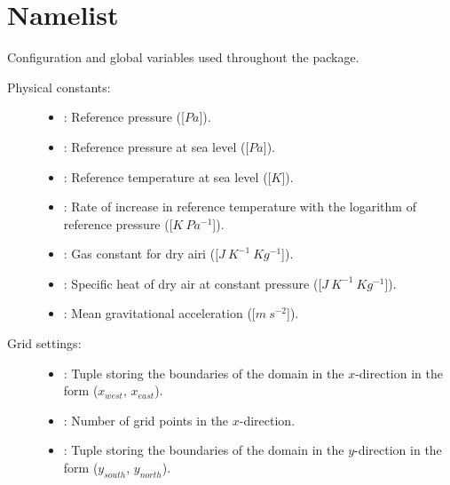 \documentclass[letterpaper,10pt,english]{sphinxmanual}
\begin{document}
\section{Namelist}
\label{\detokenize{api:namelist}}\label{\detokenize{api:module-namelist}}
Configuration and global variables used throughout the package.
\begin{description}
\item[{Physical constants:}] \leavevmode\begin{itemize}
\item {} 
: Reference pressure ({[}\(Pa\){]}).

\item {} 
: Reference pressure at sea level ({[}\(Pa\){]}).

\item {} 
: Reference temperature at sea level ({[}\(K\){]}).

\item {} 
: Rate of increase in reference temperature with the logarithm           of reference pressure ({[}\(K ~ Pa^{-1}\){]}).

\item {} 
: Gas constant for dry airi ({[}\(J ~ K^{-1} ~ Kg^{-1}\){]}).

\item {} 
: Specific heat of dry air at constant pressure ({[}\(J ~ K^{-1} ~ Kg^{-1}\){]}).

\item {} 
: Mean gravitational acceleration ({[}\(m ~ s^{-2}\){]}).

\end{itemize}

\item[{Grid settings:}] \leavevmode\begin{itemize}
\item {} 
: Tuple storing the boundaries of the domain in the \(x\)-direction              in the form (\(x_{west}\), \(x_{east}\)).

\item {} 
: Number of grid points in the \(x\)-direction.

\item {} 
: Tuple storing the boundaries of the domain in the \(y\)-direction              in the form (\(y_{south}\), \(y_{north}\)).


\end{itemize}
\end{description}
\end{document}
